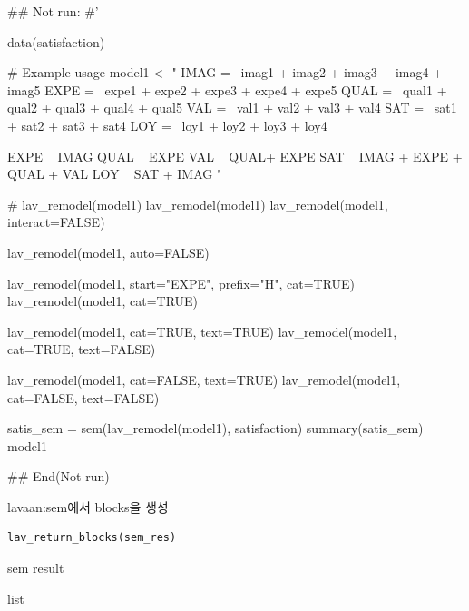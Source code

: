 \documentclass[a4paper]{book}
\begin{document}
\begin{Examples}
\begin{ExampleCode}

\#\# Not run: 
#'


data(satisfaction)

# Example usage
model1 <- "
IMAG =~ imag1 + imag2 + imag3 + imag4 + imag5
EXPE =~ expe1 + expe2 + expe3 + expe4 + expe5
QUAL =~ qual1 + qual2 + qual3 + qual4 + qual5
VAL =~ val1 + val2 + val3 + val4
SAT =~ sat1 + sat2 + sat3 + sat4
LOY =~ loy1 + loy2 + loy3 + loy4

EXPE ~ IMAG
QUAL ~ EXPE
VAL ~  QUAL+ EXPE
SAT ~ IMAG + EXPE + QUAL + VAL
LOY ~ SAT + IMAG
"



# lav_remodel(model1)
lav_remodel(model1)%
lav_remodel(model1, interact=FALSE)%

lav_remodel(model1, auto=FALSE)%

lav_remodel(model1, start="EXPE", prefix="H", cat=TRUE)
lav_remodel(model1, cat=TRUE)

lav_remodel(model1, cat=TRUE, text=TRUE)
lav_remodel(model1, cat=TRUE, text=FALSE)

lav_remodel(model1, cat=FALSE, text=TRUE)
lav_remodel(model1, cat=FALSE, text=FALSE)


satis_sem = sem(lav_remodel(model1), satisfaction)
summary(satis_sem)
model1 %



## End(Not run)


\end{ExampleCode}
\end{Examples}
%
\begin{Description}
lavaan:sem에서 blocks을 생성
\end{Description}
%
\begin{Usage}
\begin{verbatim}
lav_return_blocks(sem_res)
\end{verbatim}
\end{Usage}
%
\begin{Arguments}
\begin{ldescription}
\item[\code{sem\_res}] sem result
\end{ldescription}
\end{Arguments}
%
\begin{Value}
list
\end{Value}
\end{document}
